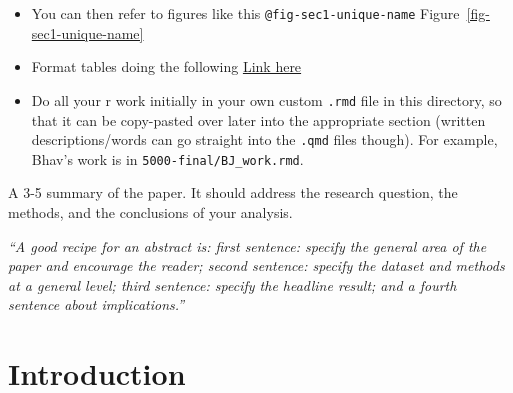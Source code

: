 \documentclass[
  letterpaper,
  DIV=11,
  numbers=noendperiod]{scrreprt}
\begin{document}
\begin{itemize}
\item
  You can then refer to figures like this \texttt{@fig-sec1-unique-name}
  Figure~\ref{fig-sec1-unique-name}
\item
  Format tables doing the following
  \href{https://quarto.org/docs/reference/cells/cells-knitr.html\#tables}{Link
  here}
\item
  Do all your r work initially in your own custom \texttt{.rmd} file in
  this directory, so that it can be copy-pasted over later into the
  appropriate section (written descriptions/words can go straight into
  the \texttt{.qmd} files though). For example, Bhav's work is in
  \texttt{5000-final/BJ\_work.rmd}.
\end{itemize}

\begin{tcolorbox}[enhanced jigsaw, bottomrule=.15mm, left=2mm, bottomtitle=1mm, leftrule=.75mm, coltitle=black, toprule=.15mm, breakable, opacitybacktitle=0.6, titlerule=0mm, colback=white, colbacktitle=quarto-callout-note-color!10!white, toptitle=1mm, arc=.35mm, rightrule=.15mm, colframe=quarto-callout-note-color-frame, opacityback=0, title=\textcolor{quarto-callout-note-color}{\faInfo}\hspace{0.5em}{From the report requirements}]

A 3-5 summary of the paper. It should address the research question, the
methods, and the conclusions of your analysis.

\emph{``A good recipe for an abstract is: first sentence: specify the
general area of the paper and encourage the reader; second sentence:
specify the dataset and methods at a general level; third sentence:
specify the headline result; and a fourth sentence about
implications.''}

\end{tcolorbox}


\hypertarget{introduction}{%
\chapter{Introduction}\label{introduction}}
\end{document}
